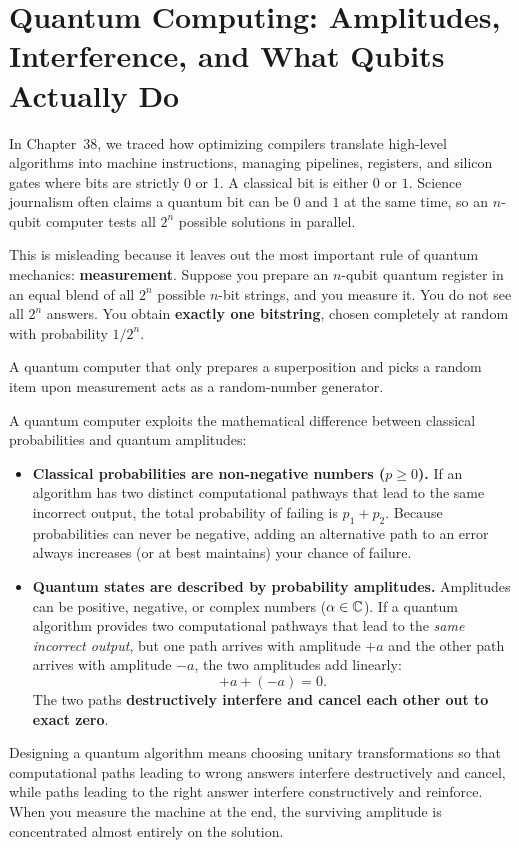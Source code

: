 \chapter{Quantum Computing: Amplitudes, Interference, and What Qubits Actually Do}
\label{ch42:quantum}

In Chapter~38, we traced how optimizing compilers translate
high-level algorithms into machine instructions, managing pipelines, registers,
and silicon gates where bits are strictly 0 or 1. A classical bit is either $0$ or
$1$. Science journalism often claims a quantum bit can be $0$ and $1$ at the same time, so an $n$-qubit
computer tests all $2^n$ possible solutions in parallel.

This is misleading because it leaves out the most important rule of
quantum mechanics: \textbf{measurement}.
Suppose you prepare an $n$-qubit quantum register in an equal blend of all
$2^n$ possible $n$-bit strings, and you measure it. You do not see all $2^n$
answers. You
obtain \textbf{exactly one bitstring}, chosen completely at random with
probability $1/2^n$.

A quantum computer that only prepares a superposition and picks a random item upon measurement acts as a random-number generator.

A quantum computer exploits the mathematical difference between
classical probabilities and quantum amplitudes:
\begin{itemize}
  \item \textbf{Classical probabilities are non-negative numbers ($p \ge 0$).}
  If an algorithm has two distinct computational pathways that lead to the same
  incorrect output, the total probability of failing is $p_1 + p_2$. Because
  probabilities can never be negative, adding an alternative path to an error
  always increases (or at best maintains) your chance of failure.
  \item \textbf{Quantum states are described by probability amplitudes.}
  Amplitudes can be positive, negative, or complex numbers ($\alpha \in \mathbb{C}$). If
  a quantum algorithm provides two computational pathways that lead to the
  \emph{same incorrect output}, but one path arrives with amplitude $+a$ and the
  other path arrives with amplitude $-a$, the two amplitudes add linearly:
  \[
    +a + (-a) = 0.
  \]
  The two paths \textbf{destructively interfere and cancel each other out to exact
  zero}.
\end{itemize}

Designing a quantum algorithm means choosing unitary transformations so that
computational paths leading to wrong answers interfere destructively and cancel,
while paths leading to the right answer interfere constructively and reinforce.
When you measure the machine at the end, the
surviving amplitude is concentrated almost entirely on the solution.

